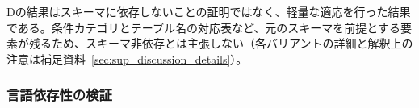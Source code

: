 \documentclass[twocolumn]{interact}
\makeatletter
\def\toprule{\noalign{\ifnum0=`}\fi
  \@aboverulesep=\abovetopsep
  \global\@belowrulesep=\belowrulesep
  \global\@thisruleclass=\@ne
  \@ifnextchar[{\@BTrule}{\@BTrule[\heavyrulewidth]}}
\def\midrule{\noalign{\ifnum0=`}\fi
  \@aboverulesep=\aboverulesep
  \global\@belowrulesep=\belowrulesep
  \global\@thisruleclass=\@ne
  \@ifnextchar[{\@BTrule}{\@BTrule[\lightrulewidth]}}
\def\bottomrule{\noalign{\ifnum0=`}\fi
  \@aboverulesep=\aboverulesep
  \global\@belowrulesep=\belowbottomsep
  \global\@thisruleclass=\@ne
  \@ifnextchar[{\@BTrule}{\@BTrule[\heavyrulewidth]}}
\makeatother
\begin{document}
\begin{table}[t]
\centering
\caption{一般化評価の結果。百分率は行レベルの実行再現率であり、適応条件はバリアントごとに異なる。Aの20クエリ（\texttt{q\_proto\_*}）は主評価245クエリの部分集合であり、100.0\%は同一問題に対する別ランの値である（主評価の単一ラン内では同20クエリは85.0\%であり、差はラン間変動を含む）；B/C/Dは主評価に含まれない別コーパスである。}
\label{tab:transfer_eval}
\footnotesize
{}
\end{table}

Dの結果はスキーマに依存しないことの証明ではなく、軽量な適応を行った結果である。条件カテゴリとテーブル名の対応表など、元のスキーマを前提とする要素が残るため、スキーマ非依存とは主張しない（各バリアントの詳細と解釈上の注意は補足資料~\ref{sec:sup_discussion_details}）。

\subsubsection{言語依存性の検証}
\label{sec:language_eval}
\end{document}
